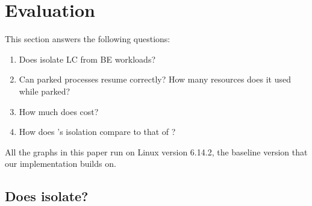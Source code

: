 \section{Evaluation}
\label{s:eval}

This section answers the following questions:
\begin{enumerate}
    \item Does \schedbe{} isolate LC from BE workloads?
    \item Can parked processes resume correctly? How many resources does it used
    while parked?
    \item How much does \schedbe{} cost?
    \item How does \schedbe{}'s isolation compare to that of \schedidle{}?
\end{enumerate}

All the graphs in this paper run on Linux version 6.14.2, the baseline version
that our implementation builds on.

\subsection{Does \schedbe{} isolate?}


